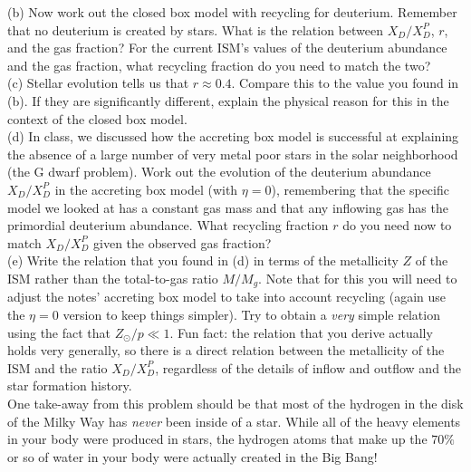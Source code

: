 \documentclass[12pt]{article}
\begin{document}
(b) Now work out the closed box model with recycling for
deuterium. Remember that no deuterium is created by stars. What is the
relation between $X_D/X_D^P$, $r$, and the gas fraction? For the
current ISM's values of the deuterium abundance and the gas fraction,
what recycling fraction do you need to match the two?\\

(c) Stellar evolution tells us that $r \approx 0.4$. Compare this to
the value you found in (b). If they are significantly different,
explain the physical reason for this in the context of the closed box
model.\\

(d) In class, we discussed how the accreting box model is successful
at explaining the absence of a large number of very metal poor stars
in the solar neighborhood (the G dwarf problem). Work out the
evolution of the deuterium abundance $X_D/X_D^P$ in the accreting box
model (with $\eta=0$), remembering that the specific model we looked
at has a constant gas mass and that any inflowing gas has the
primordial deuterium abundance. What recycling fraction $r$ do you
need now to match $X_D/X_D^P$ given the observed gas fraction?\\

(e) Write the relation that you found in (d) in terms of the
metallicity $Z$ of the ISM rather than the total-to-gas ratio
$M/M_g$. Note that for this you will need to adjust the notes'
accreting box model to take into account recycling (again use the
$\eta=0$ version to keep things simpler). Try to obtain a \emph{very}
simple relation using the fact that $Z_\odot/p \ll 1$. Fun fact: the
relation that you derive actually holds very generally, so there is a
direct relation between the metallicity of the ISM and the ratio
$X_D/X_D^P$, regardless of the details of inflow and outflow and the
star formation history.\\

One take-away from this problem should be that most of the hydrogen in
the disk of the Milky Way has \emph{never} been inside of a
star. While all of the heavy elements in your body were produced in
stars, the hydrogen atoms that make up the $70\%$ or so of water in
your body were actually created in the Big Bang!\\
\end{document}
